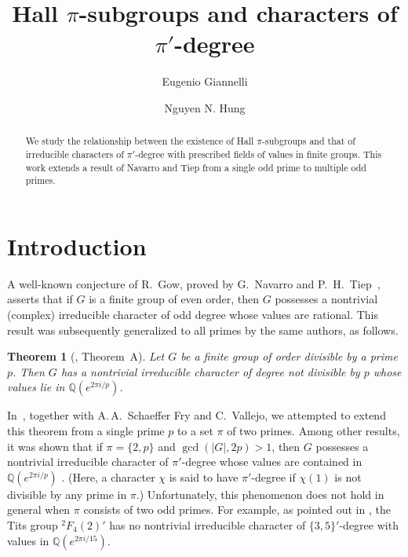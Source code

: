 \documentclass[12pt]{amsart}
\title[Hall $\pi$-subgroups and characters of $\pi'$-degree]{%
Hall $\pi$-subgroups and characters of $\pi'$-degree%
}
\author[Eugenio Giannelli]{Eugenio Giannelli}
\author[Nguyen N. Hung]{Nguyen N. Hung}
\newtheorem{theorem}{Theorem}[section]
\theoremstyle{definition}
\numberwithin{equation}{section}
\newcommand{\QQ}{{\mathbb Q}}
\begin{document}
\begin{abstract}
We study the relationship between the existence %
of Hall
$\pi$-subgroups and %
that of irreducible characters of $\pi'$-degree
with prescribed fields of values in finite groups. This work extends
a result of Navarro and Tiep from a single odd prime to multiple odd
primes.
\end{abstract}

\maketitle



\section{Introduction}

A well-known conjecture of R.~Gow, proved by G.~Navarro and
P.~H.~Tiep~\cite{Navarro-Tiep2}, asserts that if $G$ is a finite
group of even order, then $G$ possesses a nontrivial (complex)
irreducible character of odd degree whose values are rational. This
result was subsequently generalized to all primes by the same
authors, as %
follows.

\begin{theorem}[\cite{Navarro-Tiep1}, Theorem~A]\label{thm:Navarro-Tiep}
Let %
$G$ be a finite group of order divisible by a prime $p$. Then
$G$ has a nontrivial irreducible character of degree not divisible
by $p$ whose values lie in $\QQ(e^{2\pi i/p})$.
\end{theorem}

In~\cite{GHSV21}, together with A.\,A.~Schaeffer Fry and C.~Vallejo,
we attempted to extend this theorem from a single prime $p$ to a set
$\pi$ of two primes. Among other results, it was shown that if
$\pi=\{2,p\}$ and $\gcd(|G|,2p)>1$, then $G$ possesses a nontrivial
irreducible character of $\pi'$-degree whose values are contained in
$\QQ(e^{2\pi i/p})$%
. (Here, a %
character $\chi$ is said to have
$\pi'$-degree if $\chi(1)$ is not divisible by any prime in %
$\pi$.)
Unfortunately, %
this phenomenon does not hold in general when $\pi$
consists of two odd primes. For example, as pointed out in
\cite[Proposition~4.1]{GHSV21}, the Tits group ${}^2F_4(2)'$ has no
nontrivial irreducible character of $\{3,5\}'$-degree with values in
$\QQ(e^{2\pi i/15})$.
\end{document}
